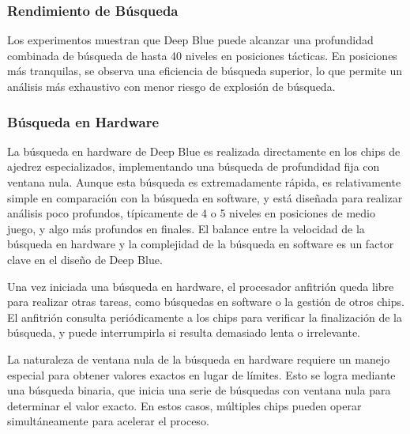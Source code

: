 \documentclass[12pt,a4paper]{article}
\begin{document}
\subsubsection*{Rendimiento de Búsqueda}
Los experimentos muestran que Deep Blue puede alcanzar una profundidad combinada de búsqueda de hasta 40 niveles en posiciones tácticas. En posiciones más tranquilas, se observa una eficiencia de búsqueda superior, lo que permite un análisis más exhaustivo con menor riesgo de explosión de búsqueda.

\subsubsection{Búsqueda en Hardware}

La búsqueda en hardware de Deep Blue es realizada directamente en los chips de ajedrez especializados, implementando una búsqueda de profundidad fija con ventana nula. Aunque esta búsqueda es extremadamente rápida, es relativamente simple en comparación con la búsqueda en software, y está diseñada para realizar análisis poco profundos, típicamente de 4 o 5 niveles en posiciones de medio juego, y algo más profundos en finales. El balance entre la velocidad de la búsqueda en hardware y la complejidad de la búsqueda en software es un factor clave en el diseño de Deep Blue.

Una vez iniciada una búsqueda en hardware, el procesador anfitrión queda libre para realizar otras tareas, como búsquedas en software o la gestión de otros chips. El anfitrión consulta periódicamente a los chips para verificar la finalización de la búsqueda, y puede interrumpirla si resulta demasiado lenta o irrelevante.

La naturaleza de ventana nula de la búsqueda en hardware requiere un manejo especial para obtener valores exactos en lugar de límites. Esto se logra mediante una búsqueda binaria, que inicia una serie de búsquedas con ventana nula para determinar el valor exacto. En estos casos, múltiples chips pueden operar simultáneamente para acelerar el proceso.
\end{document}

